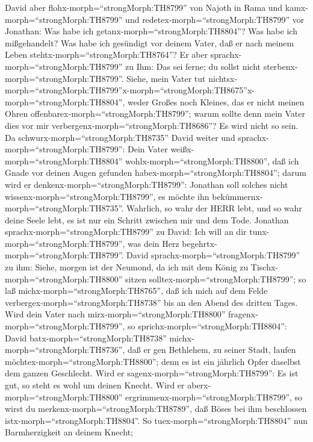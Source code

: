  David aber flohx-morph=``strongMorph:TH8799'' von Najoth in
Rama und kamx-morph=``strongMorph:TH8799'' und
redetex-morph=``strongMorph:TH8799'' vor Jonathan: Was habe ich
getanx-morph=``strongMorph:TH8804''? Was habe ich mißgehandelt? Was habe
ich gesündigt vor deinem Vater, daß er nach meinem Leben
stehtx-morph=``strongMorph:TH8764''?  Er aber
sprachx-morph=``strongMorph:TH8799'' zu Ihm: Das sei ferne; du sollst
nicht sterbenx-morph=``strongMorph:TH8799''. Siehe, mein Vater tut
nichtsx-morph=``strongMorph:TH8799''\textbar x-morph=``strongMorph:TH8675''x-morph=``strongMorph:TH8804'',
weder Großes noch Kleines, das er nicht meinen Ohren
offenbarex-morph=``strongMorph:TH8799''; warum sollte denn mein Vater
dies vor mir verbergenx-morph=``strongMorph:TH8686''? Es wird nicht so
sein.  Da schwurx-morph=``strongMorph:TH8735'' David weiter
und sprachx-morph=``strongMorph:TH8799'': Dein Vater
weißx-morph=``strongMorph:TH8804'' wohlx-morph=``strongMorph:TH8800'',
daß ich Gnade vor deinen Augen gefunden
habex-morph=``strongMorph:TH8804''; darum wird er
denkenx-morph=``strongMorph:TH8799'': Jonathan soll solches nicht
wissenx-morph=``strongMorph:TH8799'', es möchte ihn
bekümmernx-morph=``strongMorph:TH8735''. Wahrlich, so wahr der HERR
lebt, und so wahr deine Seele lebt, es ist nur ein Schritt zwischen mir
und dem Tode.  Jonathan sprachx-morph=``strongMorph:TH8799''
zu David: Ich will an dir tunx-morph=``strongMorph:TH8799'', was dein
Herz begehrtx-morph=``strongMorph:TH8799''.  David
sprachx-morph=``strongMorph:TH8799'' zu ihm: Siehe, morgen ist der
Neumond, da ich mit dem König zu Tischx-morph=``strongMorph:TH8800''
sitzen solltex-morph=``strongMorph:TH8799''; so laß
michx-morph=``strongMorph:TH8765'', daß ich mich auf dem Felde
verbergex-morph=``strongMorph:TH8738'' bis an den Abend des dritten
Tages.  Wird dein Vater nach
mirx-morph=``strongMorph:TH8800'' fragenx-morph=``strongMorph:TH8799'',
so sprichx-morph=``strongMorph:TH8804'': David
batx-morph=``strongMorph:TH8738'' michx-morph=``strongMorph:TH8736'',
daß er gen Bethlehem, zu seiner Stadt, laufen
möchtex-morph=``strongMorph:TH8800''; denn es ist ein jährlich Opfer
daselbst dem ganzen Geschlecht.  Wird er
sagenx-morph=``strongMorph:TH8799'': Es ist gut, so steht es wohl um
deinen Knecht. Wird er aberx-morph=``strongMorph:TH8800''
ergrimmenx-morph=``strongMorph:TH8799'', so wirst du
merkenx-morph=``strongMorph:TH8789'', daß Böses bei ihm beschlossen
istx-morph=``strongMorph:TH8804''.  So
tuex-morph=``strongMorph:TH8804'' nun Barmherzigkeit an deinem Knecht;
